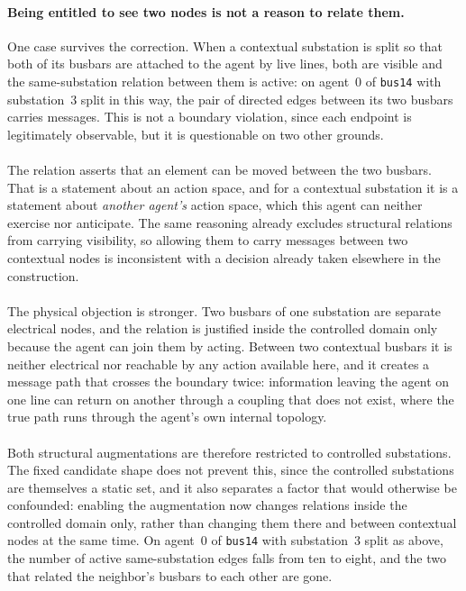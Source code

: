 {\paragraph{Being entitled to see two nodes is not a reason to relate them.}
One case survives the correction. When a contextual substation is split so that
both of its busbars are attached to the agent by live lines, both are visible
and the same-substation relation between them is active: on agent~$0$ of
\texttt{bus14} with substation~$3$ split in this way, the pair of directed edges
between its two busbars carries messages. This is not a boundary violation,
since each endpoint is legitimately observable, but it is questionable on two
other grounds.
\\
\\
The relation asserts that an element can be moved between the two busbars. That
is a statement about an action space, and for a contextual substation it is a
statement about \emph{another agent's} action space, which this agent can
neither exercise nor anticipate. The same reasoning already excludes structural
relations from carrying visibility, so allowing them to carry messages between
two contextual nodes is inconsistent with a decision already taken elsewhere in
the construction.
\\
\\
The physical objection is stronger. Two busbars of one substation are separate
electrical nodes, and the relation is justified inside the controlled domain
only because the agent can join them by acting. Between two contextual busbars
it is neither electrical nor reachable by any action available here, and it
creates a message path that crosses the boundary twice: information leaving the
agent on one line can return on another through a coupling that does not exist,
where the true path runs through the agent's own internal topology.
\\
\\
Both structural augmentations are therefore restricted to controlled
substations. The fixed candidate shape does not prevent this, since the
controlled substations are themselves a static set, and it also separates a
factor that would otherwise be confounded: enabling the augmentation now changes
relations inside the controlled domain only, rather than changing them there and
between contextual nodes at the same time. On agent~$0$ of \texttt{bus14} with
substation~$3$ split as above, the number of active same-substation edges falls
from ten to eight, and the two that related the neighbor's busbars to each other
are gone.
}

